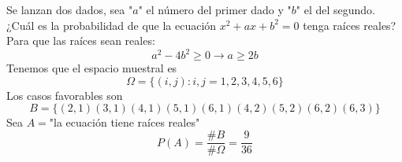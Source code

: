 \item Se lanzan dos dados, sea "$a$" el número del primer dado y "$b$" el del segundo. ¿Cuál es la probabilidad de que la ecuación $x^2+ax+b^2=0$ tenga raíces reales?\e\\
    Para que las raíces sean reales:\[a^2-4b^2\geq0\to a\geq2b\]
    Tenemos que el espacio muestral es\[\Omega=\{(i,j):i,j=1,2,3,4,5,6\}\]
    Los casos favorables son \[B=\{(2,1)(3,1)(4,1)(5,1)(6,1)(4,2)(5,2)(6,2)(6,3)\}\]
    Sea $A=$"la ecuación tiene raíces reales"\[P(A)=\frac{\#B}{\#\Omega}=\frac{9}{36}\]